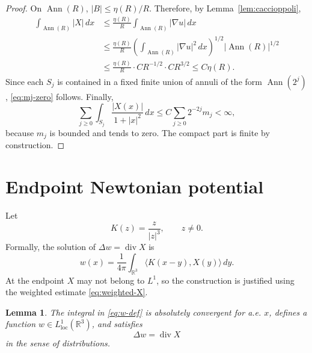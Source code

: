 \documentclass[11pt]{amsart}
\numberwithin{equation}{section}
\newtheorem{lemma}[theorem]{Lemma}
\theoremstyle{definition}
\newcommand{\R}{\mathbb R}
\newcommand{\divE}{\operatorname{div}}
\newcommand{\Ann}{\operatorname{Ann}}
\newcommand{\loc}{\mathrm{loc}}
\newcommand{\ip}[2]{\langle #1,#2\rangle}
\newcommand{\abs}[1]{\left\lvert #1\right\rvert}
\begin{document}
\begin{proof}
On $\Ann(R)$, $\abs{B}\le \eta(R)/R$.  Therefore, by Lemma~\ref{lem:caccioppoli},
$$
\begin{aligned}
        \int_{\Ann(R)}\abs{X}\,dx
        &\le \frac{\eta(R)}{R}\int_{\Ann(R)}\abs{\nabla u}\,dx                                      \\
        &\le \frac{\eta(R)}{R}
        \left(\int_{\Ann(R)}\abs{\nabla u}^2\,dx\right)^{1/2}\abs{\Ann(R)}^{1/2}                     \\
        &\le \frac{\eta(R)}{R}\cdot CR^{-1/2}\cdot CR^{3/2}
        \le C\eta(R).
\end{aligned}
$$
Since each $S_j$ is contained in a fixed finite union of annuli of the form $\Ann(2^j)$, \eqref{eq:mj-zero} follows.  Finally,
$$
        \sum_{j\ge0}\int_{S_j}\frac{\abs{X(x)}}{1+\abs{x}^2}\,dx
        \le C\sum_{j\ge0}2^{-2j}m_j<\infty,
$$
because $m_j$ is bounded and tends to zero.  The compact part is finite by construction.
\end{proof}

\section{Endpoint Newtonian potential}
\label{sec:potential}

Let
$$
        K(z)=\frac{z}{\abs z^3},\qquad z\ne0.
$$
Formally, the solution of $\Delta w=\divE X$ is
\begin{equation}\label{eq:w-def}
        w(x)=\frac1{4\pi}\int_{\R^3}\ip{K(x-y)}{X(y)}\,dy.
\end{equation}
At the endpoint $X$ may not belong to $L^1$, so the construction is justified using the weighted estimate \eqref{eq:weighted-X}.

\begin{lemma}\label{lem:weighted-convolution}
The integral in \eqref{eq:w-def} is absolutely convergent for a.e. $x$, defines a function $w\in L^1_{\loc}(\R^3)$, and satisfies
\begin{equation}\label{eq:w-equation}
        \Delta w=\divE X
\end{equation}
in the sense of distributions.
\end{lemma}
\end{document}
